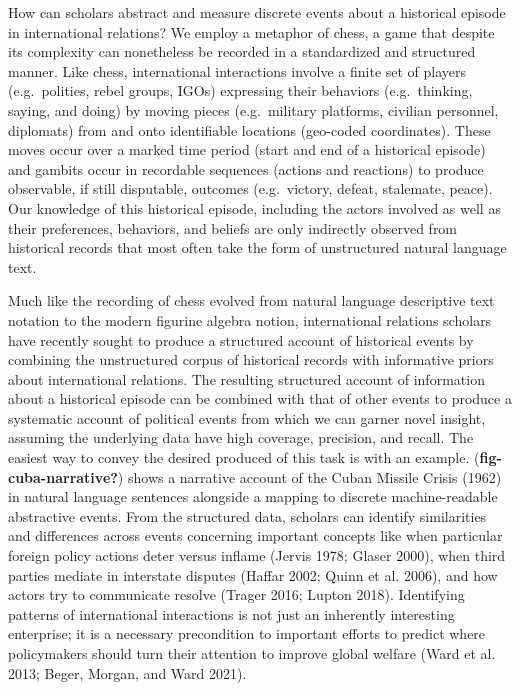 \documentclass{article}
\begin{document}
How can scholars abstract and measure discrete events about a historical
episode in international relations? We employ a metaphor of chess, a
game that despite its complexity can nonetheless be recorded in a
standardized and structured manner. Like chess, international
interactions involve a finite set of players (e.g.~polities, rebel
groups, IGOs) expressing their behaviors (e.g.~thinking, saying, and
doing) by moving pieces (e.g.~military platforms, civilian personnel,
diplomats) from and onto identifiable locations (geo-coded coordinates).
These moves occur over a marked time period (start and end of a
historical episode) and gambits occur in recordable sequences (actions
and reactions) to produce observable, if still disputable, outcomes
(e.g.~victory, defeat, stalemate, peace). Our knowledge of this
historical episode, including the actors involved as well as their
preferences, behaviors, and beliefs are only indirectly observed from
historical records that most often take the form of unstructured natural
language text.

Much like the recording of chess evolved from natural language
descriptive text notation to the modern figurine algebra notion,
international relations scholars have recently sought to produce a
structured account of historical events by combining the unstructured
corpus of historical records with informative priors about international
relations. The resulting structured account of information about a
historical episode can be combined with that of other events to produce
a systematic account of political events from which we can garner novel
insight, assuming the underlying data have high coverage, precision, and
recall. The easiest way to convey the desired produced of this task is
with an example. (\textbf{fig-cuba-narrative?}) shows a narrative
account of the Cuban Missile Crisis (1962) in natural language sentences
alongside a mapping to discrete machine-readable abstractive events.
From the structured data, scholars can identify similarities and
differences across events concerning important concepts like when
particular foreign policy actions deter versus inflame (Jervis 1978;
Glaser 2000), when third parties mediate in interstate disputes (Haffar
2002; Quinn et al. 2006), and how actors try to communicate resolve
(Trager 2016; Lupton 2018). Identifying patterns of international
interactions is not just an inherently interesting enterprise; it is a
necessary precondition to important efforts to predict where
policymakers should turn their attention to improve global welfare (Ward
et al. 2013; Beger, Morgan, and Ward 2021).
\end{document}
